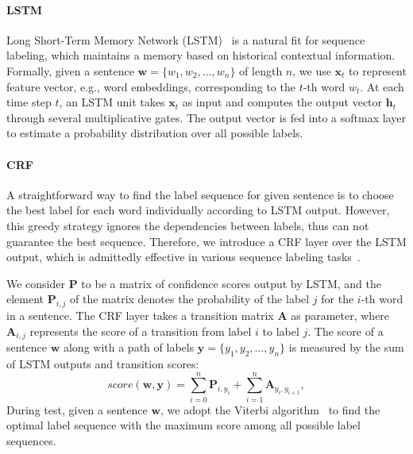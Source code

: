 \vspace{-.7em}
\paragraph{LSTM}
Long Short-Term Memory Network (LSTM)~\cite{hochreiter1997long} is a natural fit for sequence labeling, which maintains a memory based on historical contextual information. Formally, given a sentence $\bm{w} = \{w_1, w_2, \dots, w_n\}$ of length $n$, we use $\textbf{x}_t$ to represent feature vector, e.g., word embeddings, corresponding to the $t$-th word $w_t$. At each time step $t$, an LSTM unit takes $\textbf{x}_t$ as input and computes the output vector $\textbf{h}_t$ through several multiplicative gates. The output vector is fed into a softmax layer to estimate a probability distribution over all possible labels.

\vspace{-.8em}
\paragraph{CRF}
A straightforward way to find the label sequence for given sentence is to choose the 
best label for each word individually according to LSTM output.  
However, this greedy strategy ignores the dependencies between labels, thus can not guarantee the best sequence.  %
Therefore, we introduce a CRF layer over the LSTM output, which is admittedly effective in various sequence labeling tasks~\cite{collobert2011natural,huang2015bidirectional}. %

We consider $\textbf{P}$ to be a matrix of confidence scores output by LSTM, and the element $\textbf{P}_{i,j}$ of the matrix denotes the probability of the label $j$ for the $i$-th word in a sentence. The CRF layer takes a transition matrix $\textbf{A}$ as parameter, where $\textbf{A}_{i,j}$ represents the score of a transition from label $i$ to label $j$. The score of a sentence $\bm{w}$ along with a path of labels $\bm{y} = \{y_1, y_2, \ldots, y_n\}$ is measured by the sum of LSTM outputs and transition scores: 
\begin{equation}
	score(\bm{w}, \bm{y}) = \sum\limits_{i=0}^n\textbf{P}_{i, y_i} + \sum\limits_{i=1}^n\textbf{A}_{y_i, y_{i+1}},
\end{equation}
During test, given a sentence $\bm{w}$, we adopt the Viterbi algorithm~\cite{rabiner1989tutorial} to find the optimal label sequence with the maximum score among all possible label sequences.

